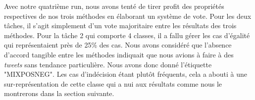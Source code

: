  Avec notre quatrième run, nous avons tenté de tirer profit des propriétés respectives de nos trois méthodes en élaborant un système de vote.
 Pour les deux tâches, il s'agit simplement d'un vote majoritaire entre les résultats des trois méthodes.
Pour la tâche 2 qui comporte 4 classes, il a fallu gérer les cas d'égalité qui représentaient près de 25\% des cas.
 Nous avons considéré que l'absence d'accord tangible entre les méthodes indiquait que nous avions à faire à des \textit{tweets} sans tendance particulière. Nous avons donc donné l'étiquette "MIXPOSNEG". Les cas d'indécision étant plutôt fréquents, cela a abouti à une sur-représentation de cette classe qui a nui aux résultats comme nous le montrerons dans la section suivante.
